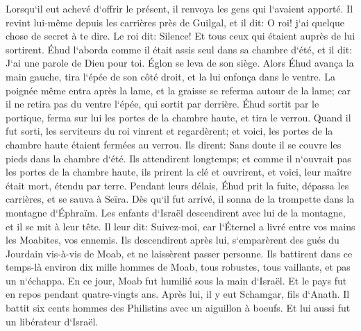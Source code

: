 \verse Lorsqu`il eut achevé d`offrir le présent, il renvoya les gens qui l`avaient apporté. 
\verse Il revint lui-même depuis les carrières près de Guilgal, et il dit: O roi! j`ai quelque chose de secret à te dire. Le roi dit: Silence! Et tous ceux qui étaient auprès de lui sortirent. 
\verse Éhud l`aborda comme il était assis seul dans sa chambre d`été, et il dit: J`ai une parole de Dieu pour toi. Églon se leva de son siège. 
\verse Alors Éhud avança la main gauche, tira l`épée de son côté droit, et la lui enfonça dans le ventre. 
\verse La poignée même entra après la lame, et la graisse se referma autour de la lame; car il ne retira pas du ventre l`épée, qui sortit par derrière. 
\verse Éhud sortit par le portique, ferma sur lui les portes de la chambre haute, et tira le verrou. 
\verse Quand il fut sorti, les serviteurs du roi vinrent et regardèrent; et voici, les portes de la chambre haute étaient fermées au verrou. Ils dirent: Sans doute il se couvre les pieds dans la chambre d`été. 
\verse Ils attendirent longtemps; et comme il n`ouvrait pas les portes de la chambre haute, ils prirent la clé et ouvrirent, et voici, leur maître était mort, étendu par terre. 
\verse Pendant leurs délais, Éhud prit la fuite, dépassa les carrières, et se sauva à Seïra. 
\verse Dès qu`il fut arrivé, il sonna de la trompette dans la montagne d`Éphraïm. Les enfants d`Israël descendirent avec lui de la montagne, et il se mit à leur tête. 
\verse Il leur dit: Suivez-moi, car l`Éternel a livré entre vos mains les Moabites, vos ennemis. Ils descendirent après lui, s`emparèrent des gués du Jourdain vis-à-vis de Moab, et ne laissèrent passer personne. 
\verse Ils battirent dans ce temps-là environ dix mille hommes de Moab, tous robustes, tous vaillants, et pas un n`échappa. 
\verse En ce jour, Moab fut humilié sous la main d`Israël. Et le pays fut en repos pendant quatre-vingts ans. 
\verse Après lui, il y eut Schamgar, fils d`Anath. Il battit six cents hommes des Philistins avec un aiguillon à boeufs. Et lui aussi fut un libérateur d`Israël. 

\chapter{}

